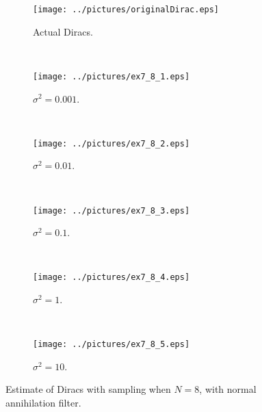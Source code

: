 \documentclass[11pt,a4paper]{report}
\begin{document}
\begin{figure}[H]
    \captionsetup[subfigure]{position=b}
    \centering
    \begin{subfigure}{0.49\textwidth}
        \texttt{[image: ../pictures/originalDirac.eps]}
        \caption{Actual Diracs.}
        \label{fig:ex7_8_0}
    \end{subfigure}
    ~
    \begin{subfigure}{0.49\textwidth}
        \texttt{[image: ../pictures/ex7\_8\_1.eps]}
        \caption{$\sigma^2 = 0.001$.}
        \label{fig:ex7_8_1}
    \end{subfigure}
    \\
    \begin{subfigure}{0.49\textwidth}
        \texttt{[image: ../pictures/ex7\_8\_2.eps]}
        \caption{$\sigma^2 = 0.01$.}
        \label{fig:ex7_8_2}
    \end{subfigure}
    ~
    \begin{subfigure}{0.49\textwidth}
        \texttt{[image: ../pictures/ex7\_8\_3.eps]}
        \caption{$\sigma^2 = 0.1$.}
        \label{fig:ex7_8_3}
    \end{subfigure}
    \\
    \begin{subfigure}{0.49\textwidth}
        \texttt{[image: ../pictures/ex7\_8\_4.eps]}
        \caption{$\sigma^2 = 1$.}
        \label{fig:ex7_8_4}
    \end{subfigure}
    ~
    \begin{subfigure}{0.49\textwidth}
        \texttt{[image: ../pictures/ex7\_8\_5.eps]}
        \caption{$\sigma^2 = 10$.}
        \label{fig:ex7_8_5}
    \end{subfigure}

    \caption{Estimate of Diracs with sampling when $N = 8$, with normal annihilation filter.}
    \label{fig:ex7_8}
\end{figure}

\end{document}
